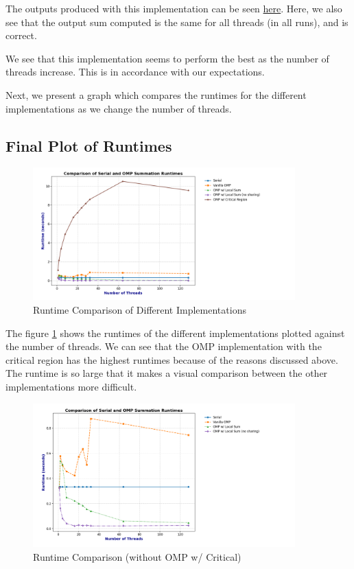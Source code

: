 \documentclass[a4paper,10pt]{article}
\begin{document}
The outputs produced with this implementation can be seen \href{https://github.com/paulmyr/DD2356-MethodsHPC/blob/master/3_open_mp/exercise3/outputs/omp_local_no_sharing_output.txt}{here}. Here, we also see that the output sum computed is the same for all threads (in all runs), and is correct. 

We see that this implementation seems to perform the best as the number of threads increase. This is in accordance with our expectations. 

Next, we present a graph which compares the runtimes for the different implementations as we change the number of threads.

\subsection{Final Plot of Runtimes}

\begin{figure}[H]
  \centering
  \includegraphics[width=0.9\textwidth]{img/ex3/ex3_comparison_all.png}
  \caption{Runtime Comparison of Different Implementations}
  \label{fig:ex3_runtime_all}
\end{figure}


The figure \ref{fig:ex3_runtime_all} shows the runtimes of the different implementations plotted against the number of threads. We can see that the OMP implementation with the critical region has the highest runtimes because of the reasons discussed above. The runtime is so large that it makes a visual comparison between the other implementations more difficult. 


\begin{figure}[H]
  \centering
  \includegraphics[width=0.9\textwidth]{img/ex3/ex3_comparison_no_critical.png}
  \caption{Runtime Comparison (without OMP w/ Critical)}
  \label{fig:ex3_runtime_no_critical}
\end{figure}
\end{document}
